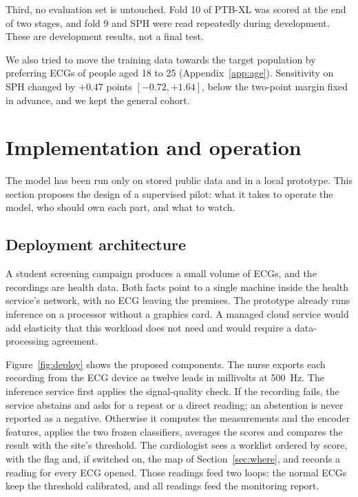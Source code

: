 \documentclass[letterpaper,11pt]{article}
\begin{document}
Third, no evaluation set is untouched. Fold 10 of PTB-XL was scored at the end of two stages, and fold 9 and SPH were read repeatedly during development. These are development results, not a final test.

We also tried to move the training data towards the target population by preferring ECGs of people aged 18 to 25 (Appendix~\ref{app:age}). Sensitivity on SPH changed by $+0.47$ points $[-0.72, +1.64]$, below the two-point margin fixed in advance, and we kept the general cohort.

\section{Implementation and operation}

The model has been run only on stored public data and in a local prototype. This section proposes the design of a supervised pilot: what it takes to operate the model, who should own each part, and what to watch.

\subsection{Deployment architecture}

A student screening campaign produces a small volume of ECGs, and the recordings are health data. Both facts point to a single machine inside the health service's network, with no ECG leaving the premises. The prototype already runs inference on a processor without a graphics card. A managed cloud service would add elasticity that this workload does not need and would require a data-processing agreement.

Figure~\ref{fig:deploy} shows the proposed components. The nurse exports each recording from the ECG device as twelve leads in millivolts at 500~Hz. The inference service first applies the signal-quality check. If the recording fails, the service abstains and asks for a repeat or a direct reading; an abstention is never reported as a negative. Otherwise it computes the measurements and the encoder features, applies the two frozen classifiers, averages the scores and compares the result with the site's threshold. The cardiologist sees a worklist ordered by score, with the flag and, if switched on, the map of Section~\ref{sec:where}, and records a reading for every ECG opened. Those readings feed two loops: the normal ECGs keep the threshold calibrated, and all readings feed the monitoring report.
\end{document}
